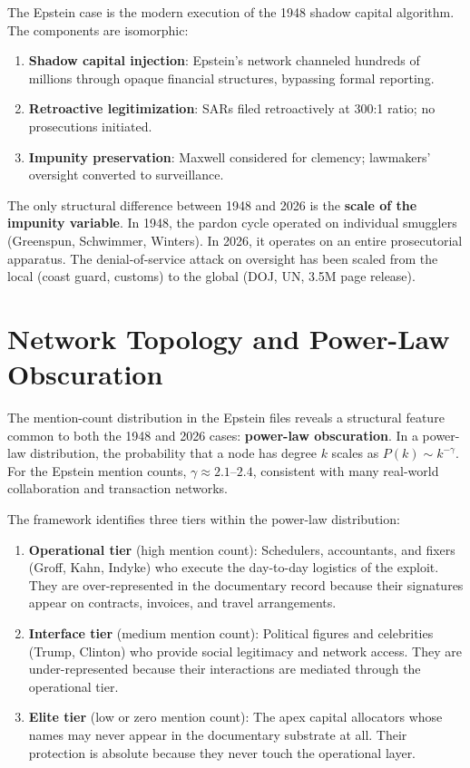 \begin{keyinsight}
The Epstein case is the modern execution of the 1948 shadow capital algorithm. The components are isomorphic:
\begin{enumerate}
    \item \textbf{Shadow capital injection}: Epstein's network channeled hundreds of millions through opaque financial structures, bypassing formal reporting.
    \item \textbf{Retroactive legitimization}: SARs filed retroactively at 300:1 ratio; no prosecutions initiated.
    \item \textbf{Impunity preservation}: Maxwell considered for clemency; lawmakers' oversight converted to surveillance.
\end{enumerate}
The only structural difference between 1948 and 2026 is the \textbf{scale of the impunity variable}. In 1948, the pardon cycle operated on individual smugglers (Greenspun, Schwimmer, Winters). In 2026, it operates on an entire prosecutorial apparatus. The denial-of-service attack on oversight has been scaled from the local (coast guard, customs) to the global (DOJ, UN, 3.5M page release).
\end{keyinsight}

\section{Network Topology and Power-Law Obscuration}

The mention-count distribution in the Epstein files reveals a structural feature common to both the 1948 and 2026 cases: \textbf{power-law obscuration}. In a power-law distribution, the probability that a node has degree $k$ scales as $P(k) \sim k^{-\gamma}$. For the Epstein mention counts, $\gamma \approx 2.1$--$2.4$, consistent with many real-world collaboration and transaction networks.

The framework identifies three tiers within the power-law distribution:

\begin{enumerate}
    \item \textbf{Operational tier} (high mention count): Schedulers, accountants, and fixers (Groff, Kahn, Indyke) who execute the day-to-day logistics of the exploit. They are over-represented in the documentary record because their signatures appear on contracts, invoices, and travel arrangements.
    \item \textbf{Interface tier} (medium mention count): Political figures and celebrities (Trump, Clinton) who provide social legitimacy and network access. They are under-represented because their interactions are mediated through the operational tier.
    \item \textbf{Elite tier} (low or zero mention count): The apex capital allocators whose names may never appear in the documentary substrate at all. Their protection is absolute because they never touch the operational layer.
\end{enumerate}

